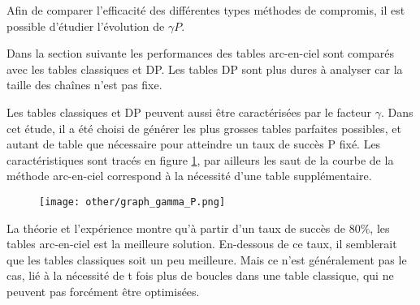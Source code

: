 	Afin de comparer l'efficacité des différentes types méthodes de compromis, il est possible d'étudier l'évolution de $\gamma{P}$.
	
	Dans la section suivante les performances des tables arc-en-ciel sont comparés avec les tables classiques et DP. Les tables DP sont plus dures à analyser car la taille des chaînes n'est pas fixe.

	Les tables classiques et DP peuvent aussi être caractérisées par le facteur $\gamma$. Dans cet étude, il a été choisi de générer les plus grosses tables parfaites possibles, et autant de table que nécessaire pour atteindre un taux de succès P fixé. Les caractéristiques sont tracés en figure \ref{fig:TMTO_carac}, par ailleurs les saut de la courbe de la méthode arc-en-ciel correspond à la nécessité d'une table supplémentaire.
\begin{figure}[h]
	\texttt{[image: other/graph\_gamma\_P.png]}
	\label{fig:TMTO_carac}
\end{figure}
	La théorie et l'expérience montre qu'à partir d'un taux de succès de 80\%, les tables arc-en-ciel est la meilleure solution. En-dessous de ce taux, il semblerait que les tables classiques soit un peu meilleure. Mais ce n'est généralement pas le cas, lié à la nécessité de t fois plus de boucles dans une table classique, qui ne peuvent pas forcément être optimisées.



\endinput{}
